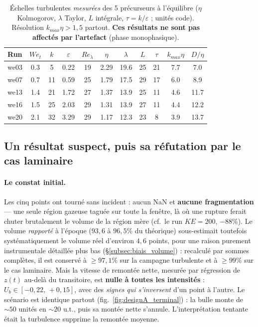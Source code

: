 \begin{table}[htbp]
    \centering
    \renewcommand{\arraystretch}{1.3}
    \begin{tabular}{lcccccccccc}
        \toprule
        Run & $We_t$ & $k$ & $\varepsilon$ & $Re_\lambda$ & $\eta$ & $\lambda$ & $L$ & $\tau$ & $k_{max}\eta$ & $D/\eta$ \\
        \midrule
        we03 & 0.3 & 5 & 0.22 & 19 & 2.29 & 19.6 & 25 & 21 & 7.7 & 7.0 \\
        we07 & 0.7 & 11 & 0.59 & 25 & 1.79 & 17.5 & 29 & 17 & 6.0 & 8.9 \\
        we13 & 1.4 & 21 & 1.72 & 27 & 1.37 & 13.9 & 25 & 11 & 4.6 & 11.7 \\
        we16 & 1.5 & 25 & 2.03 & 29 & 1.31 & 13.9 & 27 & 11 & 4.4 & 12.2 \\
        we20 & 2.1 & 32 & 3.29 & 29 & 1.17 & 12.3 & 23 & 8 & 3.9 & 13.7 \\
        \bottomrule
    \end{tabular}
    \caption{Échelles turbulentes \emph{mesurées} des 5 précurseurs à l'équilibre
    ($\eta$ Kolmogorov, $\lambda$ Taylor, $L$ intégrale, $\tau=k/\varepsilon$ ;
    unités code). Résolution $k_{max}\eta>1{,}5$ partout. \textbf{Ces résultats
    ne sont pas affectés par l'artefact} (phase monophasique).}
    \label{tab:designA_resol}
\end{table}

\subsection{Un résultat suspect, puis sa réfutation par le cas laminaire}

\paragraph{Le constat initial.} Les cinq points ont tourné sans incident : aucun
NaN et \textbf{aucune fragmentation} --- une seule région gazeuse taguée sur toute
la fenêtre, là où une rupture ferait chuter brutalement le volume de la région mère
(cf.\ le run $KE=200$, $-88\%$). Le volume \emph{rapporté} à l'époque
($93{,}6$ à $96{,}5\%$ du théorique) sous-estimait toutefois systématiquement le
volume réel d'environ $4{,}6$ points, pour une raison purement instrumentale
détaillée plus bas (\S\ref{subsec:biais_volume}) : recalculé par sommes complètes,
il est conservé à $\ge97{,}1\%$ sur la campagne turbulente et à $\ge99\%$ sur le cas
laminaire. Mais la vitesse
de remontée nette, mesurée par régression de $z(t)$ au-delà du transitoire, est
\textbf{nulle à toutes les intensités} : $U_b\in[-0{,}22,\,+0{,}15]$, avec des
\emph{signes qui s'inversent} d'un point à l'autre. Le scénario est identique
partout (fig.~\ref{fig:designA_terminal}) : la bulle monte de ${\sim}50$ unités en
${\sim}20$ u.t., puis sa montée nette s'annule. L'interprétation tentante était
\og{}la turbulence supprime la remontée moyenne\fg{}.

